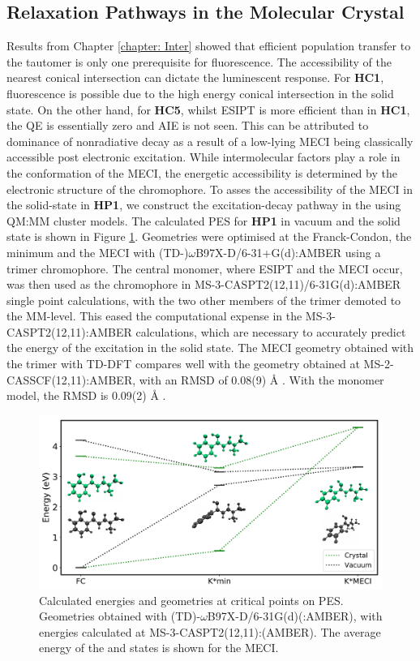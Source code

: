 \subsection{Relaxation Pathways in the Molecular Crystal}\label{section: Connecting_Relaxation}
Results from Chapter \ref{chapter: Inter} showed that efficient population transfer to the \Kstar{} tautomer is only one prerequisite for fluorescence. The accessibility of the nearest conical intersection can dictate the luminescent response. For \textbf{HC1}, fluorescence is possible due to the high energy conical intersection in the solid state. On the other hand, for \textbf{HC5}, whilst ESIPT is more efficient than in \textbf{HC1}, the \ac{QE} is essentially zero and AIE is not seen. This can be attributed to dominance of nonradiative decay as a result of a low-lying MECI being classically accessible post electronic excitation. While intermolecular factors play a role in the conformation of the MECI, the energetic accessibility is determined by the electronic structure of the chromophore. To asses the accessibility of the MECI in the solid-state in \textbf{HP1}, we construct the excitation-decay pathway in the using QM:MM cluster models. The calculated PES for \textbf{HP1} in vacuum and the solid state is shown in Figure \ref{figure: HP1_crystal_vs_vac}.
Geometries were optimised at the Franck-Condon, the \Kstar{} minimum and the MECI with (TD-)$\omega$B97X-D/6-31+G(d):AMBER using a trimer chromophore. The central monomer, where ESIPT and the MECI occur, was then used as the chromophore in MS-3-CASPT2(12,11)/6-31G(d):AMBER single point calculations, with the two other members of the trimer demoted to the MM-level. This eased the computational expense in the MS-3-CASPT2(12,11):AMBER calculations, which are necessary to accurately predict the energy of the \sone{} excitation in the solid state. The MECI geometry obtained with the trimer with TD-DFT compares well with the geometry obtained at MS-2-CASSCF(12,11):AMBER, with an \ac{RMSD} of 0.08(9) \AA{} . With the monomer model, the \ac{RMSD} is 0.09(2) \AA{} .
\begin{figure}[t]
\centering
  \includegraphics[width=0.9\linewidth]{5ConnectingCrystalStructure/HP1_crystal_vs_vac}
  \caption[PES for \textbf{HP1} in vacuum and the solid state]{Calculated energies and geometries at critical points on PES. Geometries obtained with (TD)-$\omega$B97X-D/6-31G(d)(:AMBER), with energies calculated at MS-3-CASPT2(12,11):(AMBER). The average energy of the \sone{} and \szero{} states is shown for the MECI.}
  \label{figure: HP1_crystal_vs_vac}
\end{figure}

